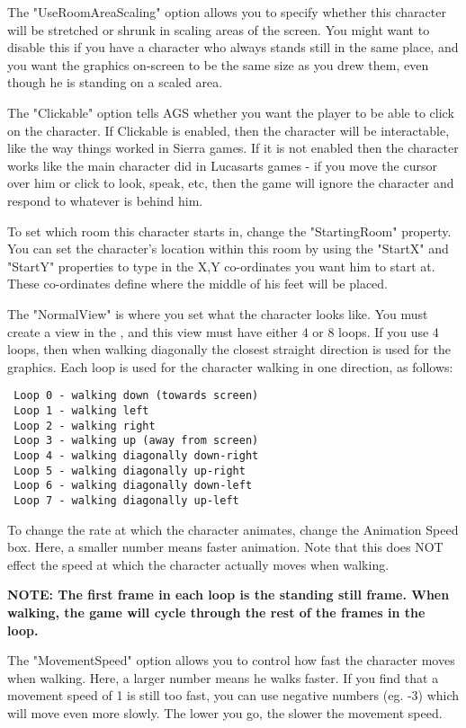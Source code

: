 The "UseRoomAreaScaling" option allows you to specify whether this
character will be stretched or shrunk in scaling areas of the screen. You might
want to disable this if you have a character who always stands still in the same
place, and you want the graphics on-screen to be the same size as you drew
them, even though he is standing on a scaled area.

The "Clickable" option tells AGS whether you want the player to be able
to click on the character. If Clickable is enabled, then the character will
be interactable, like the way things worked in Sierra games. If it is not
enabled then the character works like the main character did in Lucasarts games -
if you move the cursor over him or click to look, speak, etc, then the game will
ignore the character and respond to whatever is behind him.

To set which room this character starts in, change the "StartingRoom"
property. You can set the character's location within this room by using
the "StartX" and "StartY" properties to type in the X,Y co-ordinates you want him
to start at. These co-ordinates define where the middle of his feet will be placed.

The "NormalView" is where you set what the character looks like. You must
create a view in the , and this
view must have either 4 or 8 loops. If you use 4 loops, then when walking
diagonally the closest straight direction is used for the graphics. Each loop
is used for the character walking in one direction, as follows:
\begin{verbatim}
 Loop 0 - walking down (towards screen)
 Loop 1 - walking left
 Loop 2 - walking right
 Loop 3 - walking up (away from screen)
 Loop 4 - walking diagonally down-right
 Loop 5 - walking diagonally up-right
 Loop 6 - walking diagonally down-left
 Loop 7 - walking diagonally up-left
\end{verbatim}
To change the rate at which the character animates, change the Animation Speed box.
Here, a smaller number means faster animation. Note that this does NOT
effect the speed at which the character actually moves when walking.

\bf{NOTE:} The first frame in each loop is the standing still frame. When walking, the
game will cycle through the rest of the frames in the loop.

The "MovementSpeed" option allows you to control how fast the character moves when
walking. Here, a larger number means he walks faster. If you find that a movement
speed of 1 is still too fast, you can use negative numbers (eg. -3) which will move
even more slowly. The lower you go, the slower the movement speed.

